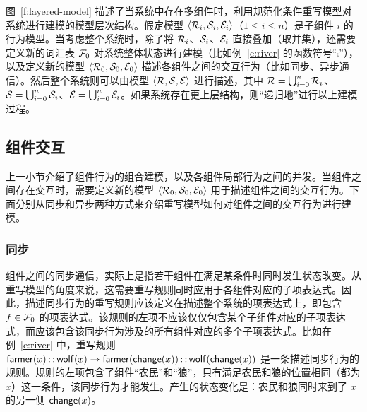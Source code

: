 图~\ref{f:layered-model} 描述了当系统中存在多组件时，利用规范化条件重写模型对系统进行建模的模型层次结构。假定模型 $\langle \mathcal{R}_i,\mathcal{S}_i,\mathcal{E}_i\rangle$（$1\le i\le n$）是子组件 $i$ 的行为模型。当考虑整个系统时，除了将 $\mathcal{R}_i$、$\mathcal{S}_i$、$\mathcal{E}_i$ 直接叠加（取并集），还需要定义新的词汇表 $\mathcal{F}_0$ 对系统整体状态进行建模（比如例~\ref{e:river} 的函数符号“$\comp$”），以及定义新的模型 $\langle \mathcal{R}_0,\mathcal{S}_0,\mathcal{E}_0\rangle$ 描述各组件之间的交互行为（比如同步、异步通信）。然后整个系统则可以由模型 $\langle \mathcal{R},\mathcal{S},\mathcal{E}\rangle$ 进行描述，其中 $\mathcal{R} = \bigcup^n_{i=0}\mathcal{R}_i$、$\mathcal{S} = \bigcup^n_{i=0}\mathcal{S}_i$、$\mathcal{E} = \bigcup^n_{i=0}\mathcal{E}_i$。如果系统存在更上层结构，则“递归地”进行以上建模过程。

\subsection{组件交互}

上一小节介绍了组件行为的组合建模，以及各组件局部行为之间的并发。当组件之间存在交互时，需要定义新的模型 $\langle \mathcal{R}_0,\mathcal{S}_0,\mathcal{E}_0\rangle$ 用于描述组件之间的交互行为。下面分别从同步和异步两种方式来介绍重写模型如何对组件之间的交互行为进行建模。


\subsubsection{同步}
\label{ss:sync}

组件之间的同步通信，实际上是指若干组件在满足某条件时同时发生状态改变。从重写模型的角度来说，这需要重写规则同时应用于各组件对应的子项表达式。因此，描述同步行为的重写规则应该定义在描述整个系统的项表达式上，即包含 $f\in\mathcal{F}_0$ 的项表达式。该规则的左项不应该仅仅包含某个子组件对应的子项表达式，而应该包含该同步行为涉及的所有组件对应的多个子项表达式。比如在例~\ref{e:river} 中，重写规则 $\operatorname{\mathsf{farmer}}(x)\operatorname{\mathsf{::}} \operatorname{\mathsf{wolf}}(x) \rightarrow \operatorname{\mathsf{farmer}}(\operatorname{\mathsf{change}}(x))\operatorname{\mathsf{::}}\operatorname{\mathsf{wolf}}(\operatorname{\mathsf{change}}(x))$ 是一条描述同步行为的规则。规则的左项包含了组件“农民”和“狼”，只有满足农民和狼的位置相同（都为 $x$）这一条件，该同步行为才能发生。产生的状态变化是：农民和狼同时来到了 $x$ 的另一侧 $\operatorname{\mathsf{change}}(x)$。

